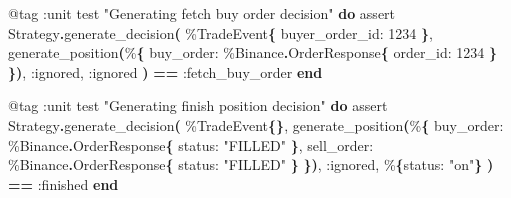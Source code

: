 \documentclass[
  oneside]{book}
\newenvironment{Shaded}{\begin{snugshade}}{\end{snugshade}}
\newcommand{\ConstantTok}[1]{\textcolor[rgb]{0.56,0.35,0.01}{#1}}
\newcommand{\DecValTok}[1]{\textcolor[rgb]{0.00,0.00,0.81}{#1}}
\newcommand{\FunctionTok}[1]{\textcolor[rgb]{0.13,0.29,0.53}{\textbf{#1}}}
\newcommand{\KeywordTok}[1]{\textcolor[rgb]{0.13,0.29,0.53}{\textbf{#1}}}
\newcommand{\NormalTok}[1]{#1}
\newcommand{\OperatorTok}[1]{\textcolor[rgb]{0.81,0.36,0.00}{\textbf{#1}}}
\newcommand{\OtherTok}[1]{\textcolor[rgb]{0.56,0.35,0.01}{#1}}
\newcommand{\StringTok}[1]{\textcolor[rgb]{0.31,0.60,0.02}{#1}}
\newcommand{\VariableTok}[1]{\textcolor[rgb]{0.00,0.00,0.00}{#1}}
\begin{document}
\begin{Shaded}
\begin{Highlighting}[]
  \OtherTok{@tag} \VariableTok{:unit}
\NormalTok{  test }\StringTok{"Generating fetch buy order decision"} \KeywordTok{do}
\NormalTok{    assert }\ConstantTok{Strategy}\OperatorTok{.}\NormalTok{generate\_decision}\FunctionTok{(}
\NormalTok{             \%}\ConstantTok{TradeEvent}\FunctionTok{\{}
               \VariableTok{buyer\_order\_id:} \DecValTok{1234}
             \FunctionTok{\}}\NormalTok{,}
\NormalTok{             generate\_position}\FunctionTok{(}\NormalTok{\%}\FunctionTok{\{}
               \VariableTok{buy\_order:}\NormalTok{ \%}\ConstantTok{Binance}\OperatorTok{.}\ConstantTok{OrderResponse}\FunctionTok{\{}
                 \VariableTok{order\_id:} \DecValTok{1234}
               \FunctionTok{\}}
             \FunctionTok{\})}\NormalTok{,}
             \VariableTok{:ignored}\NormalTok{,}
             \VariableTok{:ignored}
           \FunctionTok{)} \OperatorTok{==} \VariableTok{:fetch\_buy\_order}
  \KeywordTok{end}

  \OtherTok{@tag} \VariableTok{:unit}
\NormalTok{  test }\StringTok{"Generating finish position decision"} \KeywordTok{do}
\NormalTok{    assert }\ConstantTok{Strategy}\OperatorTok{.}\NormalTok{generate\_decision}\FunctionTok{(}
\NormalTok{             \%}\ConstantTok{TradeEvent}\FunctionTok{\{\}}\NormalTok{,}
\NormalTok{             generate\_position}\FunctionTok{(}\NormalTok{\%}\FunctionTok{\{}
               \VariableTok{buy\_order:}\NormalTok{ \%}\ConstantTok{Binance}\OperatorTok{.}\ConstantTok{OrderResponse}\FunctionTok{\{}
                 \VariableTok{status:} \StringTok{"FILLED"}
               \FunctionTok{\}}\NormalTok{,}
               \VariableTok{sell\_order:}\NormalTok{ \%}\ConstantTok{Binance}\OperatorTok{.}\ConstantTok{OrderResponse}\FunctionTok{\{}
                 \VariableTok{status:} \StringTok{"FILLED"}
               \FunctionTok{\}}
             \FunctionTok{\})}\NormalTok{,}
             \VariableTok{:ignored}\NormalTok{,}
\NormalTok{             \%}\FunctionTok{\{}\VariableTok{status:} \StringTok{"on"}\FunctionTok{\}}
           \FunctionTok{)} \OperatorTok{==} \VariableTok{:finished}
  \KeywordTok{end}


\end{Highlighting}
\end{Shaded}
\end{document}
